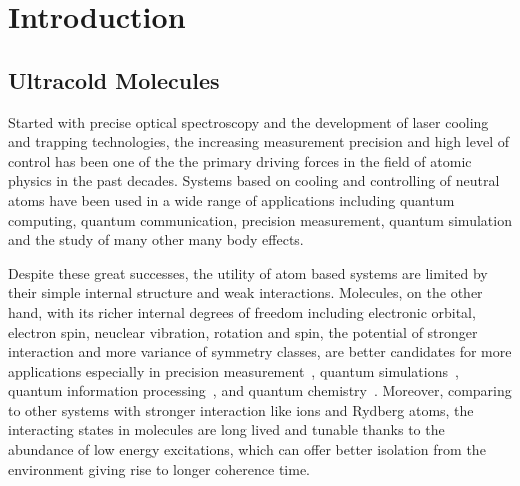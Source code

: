 
\chapter{Introduction}
\label{ch:introduction}

\section{Ultracold Molecules}
\label{ch:introduction:molecules}

Started with precise optical spectroscopy and the development of laser cooling
and trapping technologies, the increasing measurement precision and
high level of control has been one of the the primary driving forces
in the field of atomic physics in the past decades.
Systems based on cooling and controlling of neutral atoms
have been used in a wide range of applications including
quantum computing, quantum communication, precision measurement,
quantum simulation and the study of many other many body effects.

Despite these great successes, the utility of atom based systems
are limited by their simple internal structure and weak interactions.
Molecules, on the other hand, with its richer internal degrees of freedom
including electronic orbital, electron spin, neuclear vibration, rotation and spin,
the potential of stronger interaction and more variance of symmetry classes,
are better candidates for more applications especially in
precision measurement~\cite{kondov_molecular_2019,kozyryev_precision_2017,
  flambaum_electric_2020,acme_collaboration_improved_2018,cairncross_precision_2017,
  hudson_improved_2011},
quantum simulations~\cite{micheli_toolbox_2006,yao_quantum_2018,
  wall_quantum_2015,wall_realizing_2015},
quantum information processing~\cite{demille_quantum_2002,ni_dipolar_2018,
  hudson_dipolar_2018,lin_quantum_2020},
and quantum chemistry~\cite{balakrishnan_perspective_2016,hu_direct_2019,
  segev_collisions_2019,jongh_imaging_2020}.
Moreover, comparing to other systems with stronger interaction like ions and Rydberg atoms,
the interacting states in molecules are long lived and tunable thanks to
the abundance of low energy excitations,
which can offer better isolation from the environment giving rise to longer coherence time.

